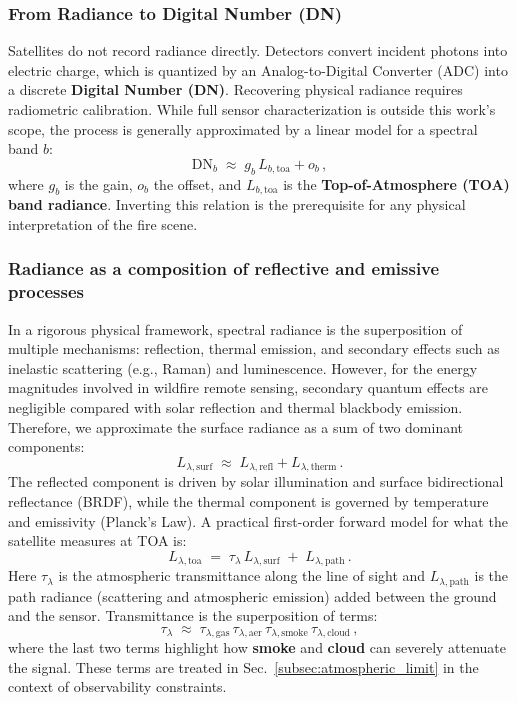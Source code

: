\subsubsection{From Radiance to Digital Number (DN)}
Satellites do not record radiance directly. Detectors convert incident photons into electric charge, which is quantized by an Analog-to-Digital Converter (ADC) into a discrete \textbf{Digital Number (DN)}. Recovering physical radiance requires radiometric calibration. While full sensor characterization is outside this work's scope, the process is generally approximated by a linear model for a spectral band $b$:
\begin{equation}
\mathrm{DN}_b \;\approx\; g_b\,L_{b,\mathrm{toa}} + o_b\,,
\end{equation}
where $g_b$ is the gain, $o_b$ the offset, and $L_{b,\mathrm{toa}}$ is the \textbf{Top-of-Atmosphere (TOA) band radiance}. Inverting this relation is the prerequisite for any physical interpretation of the fire scene.

\subsubsection{Radiance as a composition of reflective and emissive processes}
In a rigorous physical framework, spectral radiance is the superposition of multiple mechanisms: reflection, thermal emission, and secondary effects such as inelastic scattering (e.g., Raman) and luminescence. However, for the energy magnitudes involved in wildfire remote sensing, secondary quantum effects are negligible compared with solar reflection and thermal blackbody emission. Therefore, we approximate the surface radiance as a sum of two dominant components:
\begin{equation}
L_{\lambda,\mathrm{surf}} \;\approx\; L_{\lambda,\mathrm{refl}} + L_{\lambda,\mathrm{therm}}\,.
\end{equation}
The reflected component is driven by solar illumination and surface bidirectional reflectance (BRDF), while the thermal component is governed by temperature and emissivity (Planck's Law). A practical first-order forward model for what the satellite measures at TOA is:
\begin{equation}
L_{\lambda,\mathrm{toa}} \;=\; \tau_{\lambda}\,L_{\lambda,\mathrm{surf}} \; +\; L_{\lambda,\mathrm{path}}\,.
\end{equation}
Here $\tau_{\lambda}$ is the atmospheric transmittance along the line of sight and $L_{\lambda,\mathrm{path}}$ is the path radiance (scattering and atmospheric emission) added between the ground and the sensor. Transmittance is the superposition of terms:
\begin{equation}
\tau_{\lambda} \;\approx\; \tau_{\lambda,\mathrm{gas}}\,\tau_{\lambda,\mathrm{aer}}\,\tau_{\lambda,\mathrm{smoke}}\,\tau_{\lambda,\mathrm{cloud}}\,,
\label{eq:tranmitance_atm}
\end{equation}
where the last two terms highlight how \textbf{smoke} and \textbf{cloud} can severely attenuate the signal. These terms are treated in Sec.~\ref{subsec:atmospheric_limit} in the context of observability constraints.
